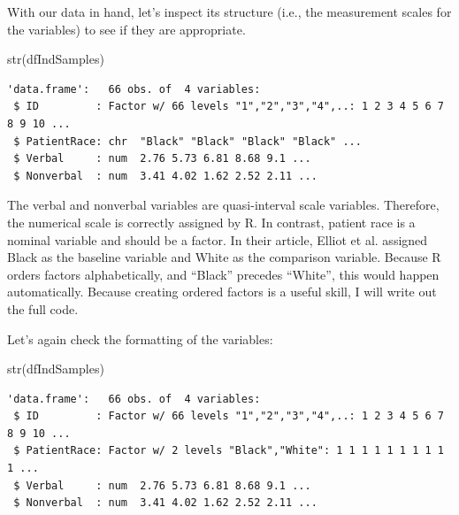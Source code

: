 \documentclass[
  11pt,
]{book}
\newenvironment{Shaded}{\begin{snugshade}}{\end{snugshade}}
\newcommand{\AttributeTok}[1]{\textcolor[rgb]{0.77,0.63,0.00}{#1}}
\newcommand{\FunctionTok}[1]{\textcolor[rgb]{0.00,0.00,0.00}{#1}}
\newcommand{\NormalTok}[1]{#1}
\newcommand{\OtherTok}[1]{\textcolor[rgb]{0.56,0.35,0.01}{#1}}
\newcommand{\SpecialCharTok}[1]{\textcolor[rgb]{0.00,0.00,0.00}{#1}}
\newcommand{\StringTok}[1]{\textcolor[rgb]{0.31,0.60,0.02}{#1}}
\begin{document}
With our data in hand, let's inspect its structure (i.e., the measurement scales for the variables) to see if they are appropriate.

\begin{Shaded}
\begin{Highlighting}[]
\FunctionTok{str}\NormalTok{(dfIndSamples)}
\end{Highlighting}
\end{Shaded}

\begin{verbatim}
'data.frame':   66 obs. of  4 variables:
 $ ID         : Factor w/ 66 levels "1","2","3","4",..: 1 2 3 4 5 6 7 8 9 10 ...
 $ PatientRace: chr  "Black" "Black" "Black" "Black" ...
 $ Verbal     : num  2.76 5.73 6.81 8.68 9.1 ...
 $ Nonverbal  : num  3.41 4.02 1.62 2.52 2.11 ...
\end{verbatim}

The verbal and nonverbal variables are quasi-interval scale variables. Therefore, the numerical scale is correctly assigned by R. In contrast, patient race is a nominal variable and should be a factor. In their article, Elliot et al. \citeyearpar{elliott_differences_2016} assigned Black as the baseline variable and White as the comparison variable. Because R orders factors alphabetically, and ``Black'' precedes ``White'', this would happen automatically. Because creating ordered factors is a useful skill, I will write out the full code.

\begin{Shaded}
\end{Shaded}

Let's again check the formatting of the variables:

\begin{Shaded}
\begin{Highlighting}[]
\FunctionTok{str}\NormalTok{(dfIndSamples)}
\end{Highlighting}
\end{Shaded}

\begin{verbatim}
'data.frame':   66 obs. of  4 variables:
 $ ID         : Factor w/ 66 levels "1","2","3","4",..: 1 2 3 4 5 6 7 8 9 10 ...
 $ PatientRace: Factor w/ 2 levels "Black","White": 1 1 1 1 1 1 1 1 1 1 ...
 $ Verbal     : num  2.76 5.73 6.81 8.68 9.1 ...
 $ Nonverbal  : num  3.41 4.02 1.62 2.52 2.11 ...
\end{verbatim}
\end{document}

